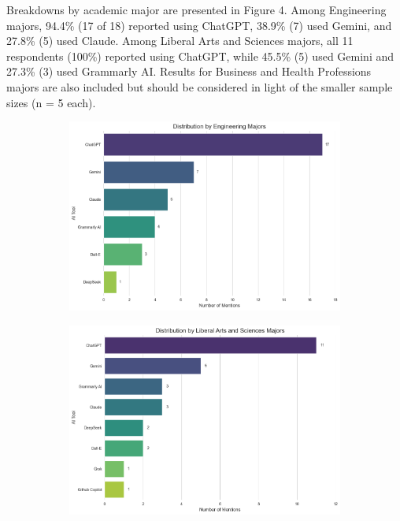 \documentclass[12pt]{article}
\begin{document}
Breakdowns by academic major are presented in Figure 4. Among Engineering majors, 94.4\% (17 of 18) reported using ChatGPT, 38.9\% (7) used Gemini, and 27.8\% (5) used Claude. Among Liberal Arts and Sciences majors, all 11 respondents (100\%) reported using ChatGPT, while 45.5\% (5) used Gemini and 27.3\% (3) used Grammarly AI. Results for Business and Health Professions majors are also included but should be considered in light of the smaller sample sizes (n = 5 each). 

\begin{figure}[htbp]
  \centering
  \begin{subfigure}[b]{0.45\textwidth}
    \includegraphics[width=\textwidth]{fig4-1.png} %
    \label{fig:subfig1a}
  \end{subfigure}
  \hfill %
  \begin{subfigure}[b]{0.45\textwidth}
    \includegraphics[width=\textwidth]{fig4-2.png} %

\end{subfigure}
\end{figure}
\end{document}
